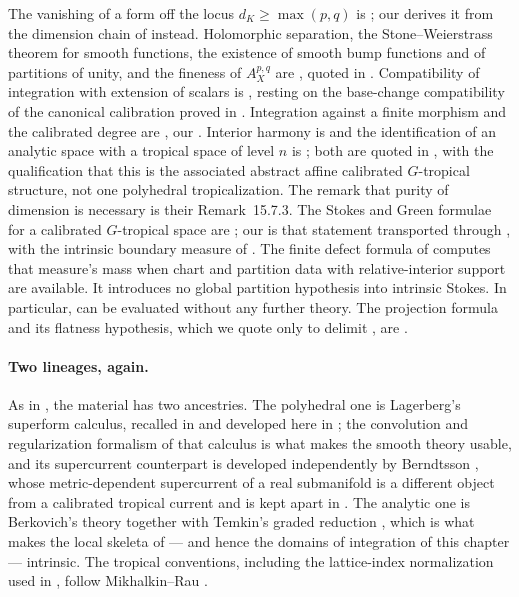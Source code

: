 The vanishing of a form off the locus $d_K\ge\max(p,q)$ is
\cite[Proposition~15.2.1]{CLD25}; our  derives it
from the dimension chain of  instead.
Holomorphic separation, the Stone--Weierstrass theorem for smooth functions,
the existence of smooth bump functions and of partitions of unity, and the
fineness of $A^{p,q}_X$ are \cite[\S15.2]{CLD25}, quoted in
.  Compatibility of integration with
extension of scalars is \cite[Propositions~15.3.1--15.3.2]{CLD25}, resting on
the base-change compatibility of the canonical calibration proved in
.  Integration against a finite
morphism and the calibrated degree are \cite[\S15.4]{CLD25}, our
.  Interior harmony is
\cite[Theorem~15.6.1]{CLD25} and the identification of an analytic space with
a tropical space of level $n$ is \cite[Theorem~15.7.1]{CLD25}; both are quoted
in , with the qualification that this is
the associated abstract affine calibrated $G$-tropical structure, not one
polyhedral tropicalization.  The remark
that purity of dimension is necessary is their Remark~15.7.3.  The Stokes and
Green formulae for a calibrated $G$-tropical space are
\cite[Proposition~5.11.1]{CLD25}; our  is that
statement transported through , with the
intrinsic boundary measure of \cite[\S\S4.6, 5.9]{CLD25}.
The finite defect formula of  computes
that measure's mass when chart and partition data with relative-interior
support are available.  It introduces no global partition hypothesis
into intrinsic Stokes.  In particular,
 can be evaluated without any further theory.
The projection formula and its flatness hypothesis, which we quote only to
delimit , are \cite[Theorem~16.5.4 and
Remark~16.5.6]{CLD25}.

\paragraph{Two lineages, again.}
As in , the material has two ancestries.
The polyhedral one is Lagerberg's superform calculus, recalled in
\cite[\S1]{CLD25} and developed here in ; the
convolution and regularization formalism of that calculus is what makes the
smooth theory usable, and its supercurrent counterpart is developed
independently by Berndtsson \cite{Ber19Super}, whose metric-dependent
supercurrent of a real submanifold is a different object from a calibrated
tropical current and is kept apart in .  The
analytic one is Berkovich's theory \cite{Berk12} together with Temkin's
graded reduction \cite{Temkin2004,Tem16}, which is what makes the local
skeleta of  --- and hence the domains of
integration of this chapter --- intrinsic.  The tropical conventions,
including the lattice-index normalization used in
, follow Mikhalkin--Rau
\cite[\S\S4.2, 4.6]{MR18Tropical}.

